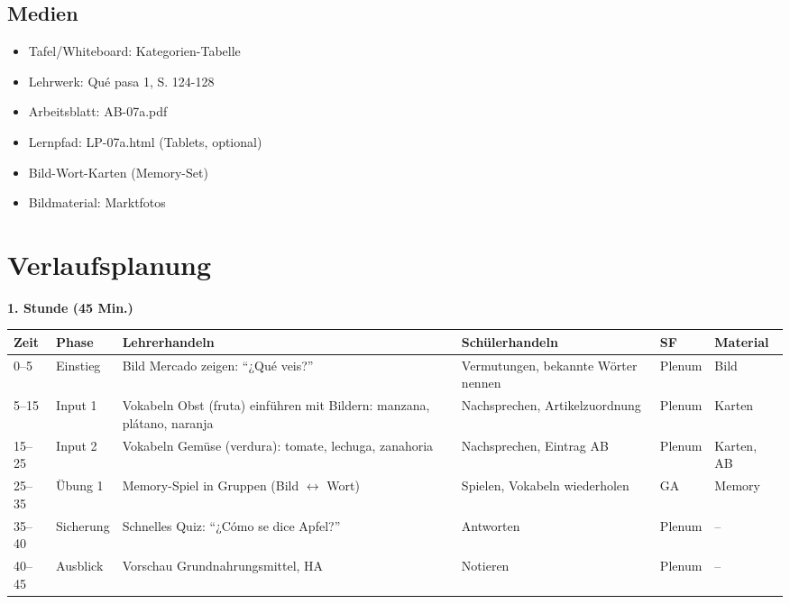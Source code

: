 \documentclass[11pt,a4paper]{article}
\newcommand{\lehrwerk}{Qué pasa 1}
\newcommand{\lehrwerkseite}{S. 124-128}
\begin{document}
\subsection{Medien}
\begin{itemize}
    \item Tafel/Whiteboard: Kategorien-Tabelle
    \item Lehrwerk: \lehrwerk, \lehrwerkseite
    \item Arbeitsblatt: AB-07a.pdf
    \item Lernpfad: LP-07a.html (Tablets, optional)
    \item Bild-Wort-Karten (Memory-Set)
    \item Bildmaterial: Marktfotos
\end{itemize}

\section{Verlaufsplanung}

\textbf{1. Stunde (45 Min.)}

\begin{longtable}{|p{1cm}|p{1.5cm}|p{4cm}|p{3cm}|p{1.5cm}|p{2cm}|}
\hline
\textbf{Zeit} & \textbf{Phase} & \textbf{Lehrerhandeln} & \textbf{Schülerhandeln} & \textbf{SF} & \textbf{Material} \\
\hline
\endhead

0--5 & Einstieg & Bild Mercado zeigen: ``¿Qué veis?'' & Vermutungen, bekannte Wörter nennen & Plenum & Bild \\
\hline

5--15 & Input 1 & Vokabeln Obst (fruta) einführen mit Bildern: manzana, plátano, naranja & Nachsprechen, Artikelzuordnung & Plenum & Karten \\
\hline

15--25 & Input 2 & Vokabeln Gemüse (verdura): tomate, lechuga, zanahoria & Nachsprechen, Eintrag AB & Plenum & Karten, AB \\
\hline

25--35 & Übung 1 & Memory-Spiel in Gruppen (Bild $\leftrightarrow$ Wort) & Spielen, Vokabeln wiederholen & GA & Memory \\
\hline

35--40 & Sicherung & Schnelles Quiz: ``¿Cómo se dice Apfel?'' & Antworten & Plenum & -- \\
\hline

40--45 & Ausblick & Vorschau Grundnahrungsmittel, HA & Notieren & Plenum & -- \\
\hline
\end{longtable}
\end{document}
